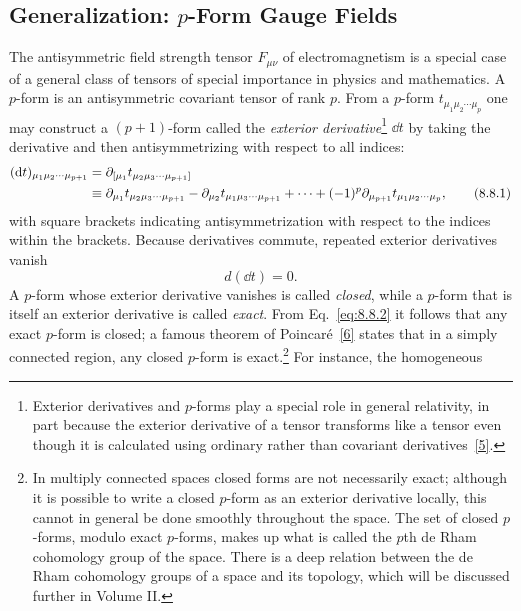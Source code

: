 
\subsection[Generalization: \texorpdfstring{$p$}{p}-Form Gauge Fields]{Generalization: \texorpdfstring{$p$}{p}-Form Gauge
Fields\texorpdfstring{\protect\footnotemark}{}}

The antisymmetric field strength tensor $F_{\mu\nu}$ of electromagnetism is a
special case of a general class of tensors of special importance in physics
and mathematics. A $p$-form is an antisymmetric covariant tensor of rank $p$.
From a $p$-form $t_{\mu_1\mu_2\cdots\mu_p}$ one may construct a $(p+1)$-form
called the \emph{exterior derivative}\footnote{Exterior derivatives and
$p$-forms play a special role in general relativity, in part because the
exterior derivative of a tensor transforms like a tensor even though it is
calculated using ordinary rather than covariant derivatives~\hyperref[ref:8.5]{[5]}.} $\dd t$ by
taking the derivative and then antisymmetrizing with respect to all indices:
\begin{align}
(\mathop{}\!\mathrm{d} t)_{\mu_1\mu_2\cdots\mu_{p+1}}
&=\partial_{[\mu_1}t_{\mu_2\mu_3\cdots\mu_{p+1}]}
\notag\\
&\equiv\partial_{\mu_1}t_{\mu_2\mu_3\cdots\mu_{p+1}}
-\partial_{\mu_2}t_{\mu_1\mu_3\cdots\mu_{p+1}}+\cdots
+(-1)^p\partial_{\mu_{p+1}}t_{\mu_1\mu_2\cdots\mu_p},
\tag{8.8.1}\label{eq:8.8.1}
\end{align}
with square brackets indicating antisymmetrization with respect to the
indices within the brackets. Because derivatives commute, repeated exterior
derivatives vanish
\begin{equation}
d(\dd t)=0.
\tag{8.8.2}\label{eq:8.8.2}
\end{equation}
A $p$-form whose exterior derivative vanishes is called \emph{closed}, while
a $p$-form that is itself an exterior derivative is called \emph{exact}. From
Eq.~\eqref{eq:8.8.2} it follows that any exact $p$-form is closed; a famous theorem of
Poincaré~\hyperref[ref:8.6]{[6]} states that in a simply connected region, any closed $p$-form is
exact.\footnote{In multiply connected spaces closed forms are not necessarily
exact; although it is possible to write a closed $p$-form as an exterior
derivative locally, this cannot in general be done smoothly throughout the
space. The set of closed $p$-forms, modulo exact $p$-forms, makes up what is
called the $p$th de Rham cohomology group of the space. There is a deep
relation between the de Rham cohomology groups of a space and its topology,
which will be discussed further in Volume II.} For instance, the homogeneous
